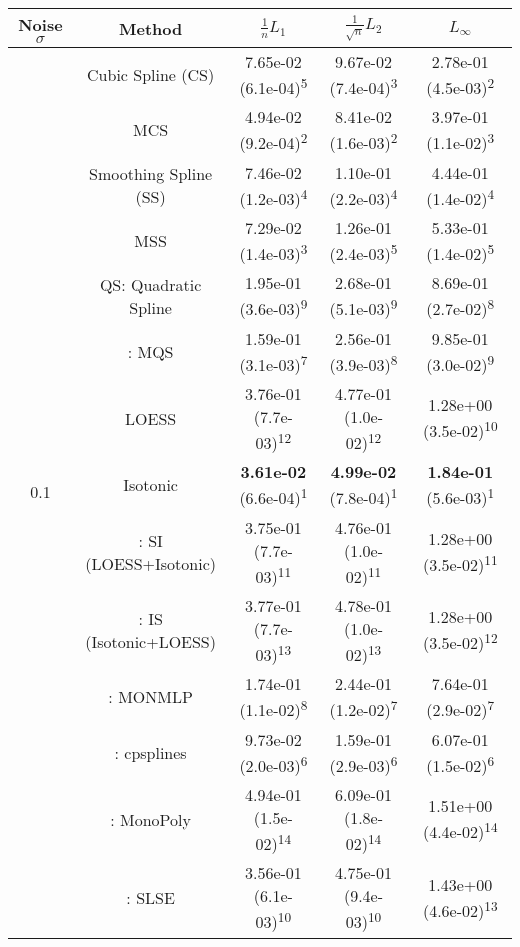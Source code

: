 \begin{tabular}{ccccc}
\toprule
Noise $\sigma$ & Method&$\frac 1n L_1$&$\frac{1}{\sqrt n}L_2$&$L_\infty$\tabularnewline
\midrule
\multirow{14}{*}{0.1}&Cubic Spline (CS)& 7.65e-02 (6.1e-04)\textsuperscript{5}& 9.67e-02 (7.4e-04)\textsuperscript{3}& 2.78e-01 (4.5e-03)\textsuperscript{2}\tabularnewline
&MCS& 4.94e-02 (9.2e-04)\textsuperscript{2}& 8.41e-02 (1.6e-03)\textsuperscript{2}& 3.97e-01 (1.1e-02)\textsuperscript{3}\tabularnewline
&Smoothing Spline (SS)& 7.46e-02 (1.2e-03)\textsuperscript{4}& 1.10e-01 (2.2e-03)\textsuperscript{4}& 4.44e-01 (1.4e-02)\textsuperscript{4}\tabularnewline
&MSS& 7.29e-02 (1.4e-03)\textsuperscript{3}& 1.26e-01 (2.4e-03)\textsuperscript{5}& 5.33e-01 (1.4e-02)\textsuperscript{5}\tabularnewline
&QS: Quadratic Spline& 1.95e-01 (3.6e-03)\textsuperscript{9}& 2.68e-01 (5.1e-03)\textsuperscript{9}& 8.69e-01 (2.7e-02)\textsuperscript{8}\tabularnewline
&\textcite{heMonotoneBsplineSmoothing1998}: MQS& 1.59e-01 (3.1e-03)\textsuperscript{7}& 2.56e-01 (3.9e-03)\textsuperscript{8}& 9.85e-01 (3.0e-02)\textsuperscript{9}\tabularnewline
&LOESS& 3.76e-01 (7.7e-03)\textsuperscript{12}& 4.77e-01 (1.0e-02)\textsuperscript{12}& 1.28e+00 (3.5e-02)\textsuperscript{10}\tabularnewline
&Isotonic& \textbf{3.61e-02} (6.6e-04)\textsuperscript{1}& \textbf{4.99e-02} (7.8e-04)\textsuperscript{1}& \textbf{1.84e-01} (5.6e-03)\textsuperscript{1}\tabularnewline
&\textcite{mammenEstimatingSmoothMonotone1991}: SI (LOESS+Isotonic)& 3.75e-01 (7.7e-03)\textsuperscript{11}& 4.76e-01 (1.0e-02)\textsuperscript{11}& 1.28e+00 (3.5e-02)\textsuperscript{11}\tabularnewline
&\textcite{mammenEstimatingSmoothMonotone1991}: IS (Isotonic+LOESS)& 3.77e-01 (7.7e-03)\textsuperscript{13}& 4.78e-01 (1.0e-02)\textsuperscript{13}& 1.28e+00 (3.5e-02)\textsuperscript{12}\tabularnewline
&\textcite{cannonMonmlpMultilayerPerceptron2017}: MONMLP& 1.74e-01 (1.1e-02)\textsuperscript{8}& 2.44e-01 (1.2e-02)\textsuperscript{7}& 7.64e-01 (2.9e-02)\textsuperscript{7}\tabularnewline
&\textcite{navarro-garciaConstrainedSmoothingOutofrange2023}: cpsplines& 9.73e-02 (2.0e-03)\textsuperscript{6}& 1.59e-01 (2.9e-03)\textsuperscript{6}& 6.07e-01 (1.5e-02)\textsuperscript{6}\tabularnewline
&\textcite{murrayFastFlexibleMethods2016a}: MonoPoly& 4.94e-01 (1.5e-02)\textsuperscript{14}& 6.09e-01 (1.8e-02)\textsuperscript{14}& 1.51e+00 (4.4e-02)\textsuperscript{14}\tabularnewline
&\textcite{groeneboomConfidenceIntervalsMonotone2023}: SLSE& 3.56e-01 (6.1e-03)\textsuperscript{10}& 4.75e-01 (9.4e-03)\textsuperscript{10}& 1.43e+00 (4.6e-02)\textsuperscript{13}\tabularnewline
\midrule

\end{tabular}
